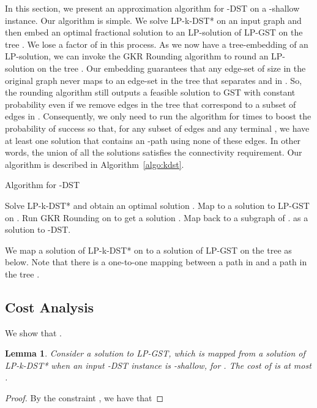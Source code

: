 \documentclass[11pt]{article}
\newtheorem{lemma}[theorem]{Lemma}
\theoremstyle{definition}
\theoremstyle{remark}
\begin{document}
In this section, we present an approximation algorithm
for -DST on a -shallow instance. 
Our algorithm is simple.
We solve LP-k-DST* on an input graph  
and then embed an optimal fractional solution  to 
an LP-solution  of LP-GST on the tree . 
We lose a factor of  in this process.
As we now have a tree-embedding of an LP-solution,
we can invoke the GKR Rounding algorithm \cite{GargKR00} to round
an LP-solution on the tree .
Our embedding guarantees that any edge-set of size  
in the original graph  never maps to 
an edge-set in the tree  that 
separates  and  in . 
So, the rounding algorithm still outputs a feasible solution to GST
with constant probability even if we remove edges in the tree
 that correspond to a subset of  edges in .
Consequently, we only need to run the algorithm for 
 times
to boost the probability of success so that,
for any subset of  edges and any terminal ,
we have at least one solution that 
contains an -path using none of these  edges.
In other words, the union of all the solutions
satisfies the connectivity requirement.
Our algorithm is described in Algorithm~\ref{algo:kdst}.

\begin{algorithm}
\caption{Algorithm for -DST}
\begin{algorithmic}
\label{algo:kdst}
\STATE Solve LP-k-DST* and obtain an optimal solution .
\STATE Map  to a solution  to LP-GST on .
\FOR{ \TO }
   \STATE Run GKR Rounding on  to get a solution . 
   \STATE Map  back to a subgraph  of .
\ENDFOR
\RETURN  as a solution to -DST.
\end{algorithmic}
\end{algorithm}

We map a solution  of LP-k-DST* on  to 
a solution  of LP-GST on the tree 
as below.
Note that there is a one-to-one mapping between a path in  and 
a path in the tree .


\subsection{Cost Analysis}
\label{sec:cost-analysis}

We show that .

\begin{lemma}
\label{lem:cost-kdst-mapping}
Consider a solution  to LP-GST, which is mapped from 
a solution  of LP-k-DST* when 
an input -DST instance is -shallow,
for .
The cost of  is at most
.
\end{lemma}
\begin{proof}
By the constraint 
,
we have that

\end{proof}
\end{document}
